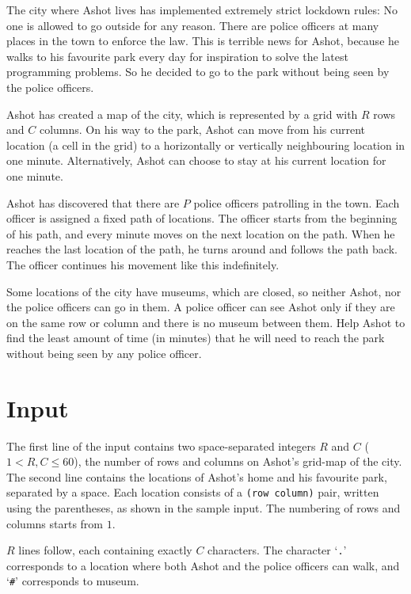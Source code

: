 The city where Ashot lives has implemented extremely strict lockdown rules: No one is allowed to go outside for any reason.
There are police officers at many places in the town to enforce the law.
This is terrible news for Ashot, because he walks to his favourite park every day for inspiration to solve the latest programming problems.
So he decided to go to the park without being seen by the police officers.

Ashot has created a map of the city, which is represented by a grid with $R$ rows and $C$ columns.
On his way to the park, Ashot can move from his current location (a cell in the grid) to a horizontally or vertically neighbouring location in one minute.
Alternatively, Ashot can choose to stay at his current location for one minute.

Ashot has discovered that there are $P$ police officers patrolling in the town.
Each officer is assigned a fixed path of locations.
The officer starts from the beginning of his path, and
every minute moves on the next location on the path.
When he reaches the last location of the path, he turns around and follows the path back.
The officer continues his movement like this indefinitely.

Some locations of the city have museums, which are closed, so neither Ashot, nor the police officers can go in them.
A police officer can see Ashot only if they are on the same row or column and there is no museum between them.
Help Ashot to find the least amount of time (in minutes) that he will need to reach the park without being seen by any police officer.

\section*{Input}
The first line of the input contains two space-separated integers $R$ and $C$ ($1 < R, C \leq 60$), the number of rows and columns on Ashot's grid-map of the city.
The second line contains the locations of Ashot's home and his favourite park, separated by a space.
Each location consists of a \texttt{(row column)} pair, written using the parentheses, as shown in the sample input.
The numbering of rows and columns starts from $1$.

$R$ lines follow, each containing exactly $C$ characters.
The character `\texttt{.}' corresponds to a location where both Ashot and the police officers can walk, and `\texttt{\#}' corresponds to museum.

